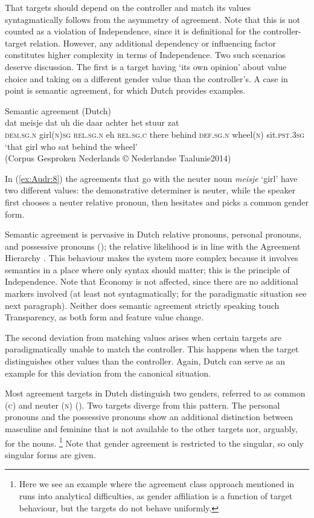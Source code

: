 \documentclass[output=collectionpaper]{langsci/langscibook}
\begin{document}
That targets should depend on the controller and match its values syntagmatically follows from the asymmetry of agreement. Note that this is not counted as a violation of Independence, since it is definitional for the controller-target relation. However, any additional dependency or influencing factor constitutes higher complexity in terms of Independence. Two such scenarios deserve discussion. The first is a target having `its own opinion' about value choice and taking on a different gender value than the controller's. A case in point is semantic agreement, for which Dutch provides examples.

\ea
\label{ex:Audr:8}
Semantic agreement (Dutch)\\
\gll dat meisje dat uh die daar achter het stuur zat\\
     \textsc{dem.sg.n} girl(\textsc{n})\textsc{sg} \textsc{rel.sg.n} eh \textsc{rel.sg.c} there behind \textsc{def.sg.n} wheel(\textsc{n}) sit.\textsc{pst.3sg}\\
\glt `that girl who sat behind the wheel'\\
(Corpus Gesproken Nederlands © Nederlandse Taalunie2014)
\z

In (\ref{ex:Audr:8}) the agreements that go with the neuter noun \textit{meisje} `girl' have two different values: the demonstrative determiner is neuter, while the speaker first chooses a neuter relative pronoun, then hesitates and picks a common gender form.

Semantic agreement is pervasive in Dutch relative pronouns, personal pronouns, and possessive pronouns (\citealt{Audring2006,Audring2009}); the relative likelihood is in line with the Agreement Hierarchy \citep{Corbett1979}. This behaviour makes the system more complex because it involves semantics in a place where only syntax should matter; this is the principle of Independence. Note that Economy is not affected, since there are no additional markers involved (at least not syntagmatically; for the paradigmatic situation see next paragraph). Neither does semantic agreement \textendash{} strictly speaking \textendash{} touch Transparency, as both form and feature value change.

The second deviation from matching values arises when certain targets are paradigmatically unable to match the controller. This happens when the target distinguishes other values than the controller. Again, Dutch can serve as an example for this deviation from the canonical situation.

Most agreement targets in Dutch distinguish two genders, referred to as common (\textsc{c}) and neuter (\textsc{n}) (). Two targets diverge from this pattern. The personal pronouns and the possessive pronouns show an additional distinction between masculine and feminine that is not available to the other targets nor, arguably, for the nouns.%
\footnote{Here we see an example where the agreement class approach mentioned in  runs into analytical difficulties, as gender affiliation is a function of target behaviour, but the targets do not behave uniformly.} %
Note that gender agreement is restricted to the singular, so only singular forms are given.
\end{document}
